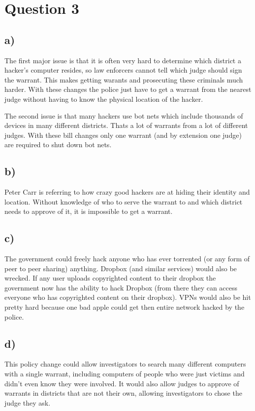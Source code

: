\documentclass{article}
\begin{document}
\section{Question 3} %
\label{sec:question_3}
\subsection{a)} %
\label{sub:a_}
The first major issue is that it is often very hard to determine which district a hacker's computer resides, so law enforcers cannot tell which judge should sign the warrant. This makes getting warants and prosecuting these criminals much harder. With these changes the police just have to get a warrant from the nearest judge without having to know the physical location of the hacker. 

The second issue is that many hackers use bot nets which include thousands of devices in many different districts. Thats a lot of warrants from a lot of different judges. With these bill changes only one warrant (and by extension one judge) are required to shut down bot nets.
\subsection{b)} %
\label{sub:b_}
Peter Carr is referring to how crazy good hackers are at hiding their identity and location. Without knowledge of who to serve the warrant to and which district needs to approve of it, it is impossible to get a warrant. 
\subsection{c)} %
\label{sub:c_}
The government could freely hack anyone who has ever torrented (or any form of peer to peer sharing) anything. Dropbox (and similar services) would also be wrecked. If any user uploads copyrighted content to their dropbox the government now has the ability to hack Dropbox (from there they can access everyone who has copyrighted content on their dropbox). VPNs would also be hit pretty hard because one bad apple could get then entire network hacked by the police.
\subsection{d)} %
\label{sub:d_}
This policy change could allow investigators to search many different computers with a single warrant, including computers of people who were just victims and didn't even know they were involved. It would also allow judges to approve of warrants in districts that are not their own, allowing investigators to chose the judge they ask.
\end{document}
